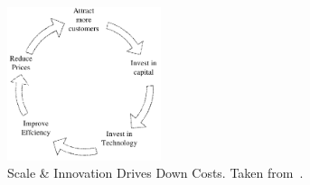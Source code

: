 

\begin{figure}
	\centering
	\includegraphics[width=0.4\textwidth]{./Figures/ScaleInnovation.pdf}
	\caption{Scale \& Innovation Drives Down Costs. Taken from~\cite{gavin2014ams}.}
	\label{fig:ScaleInnovation}
\end{figure}

